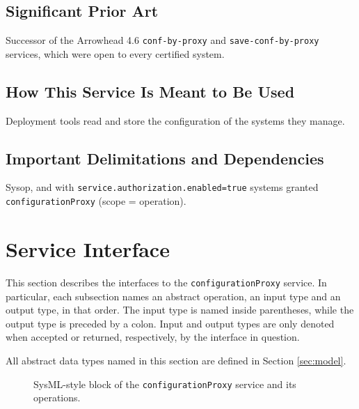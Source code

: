 \documentclass[a4paper]{arrowhead}
\begin{document}
\subsection{Significant Prior Art}

Successor of the Arrowhead 4.6 \texttt{conf-\allowbreak{}by-\allowbreak{}proxy} and \texttt{save-\allowbreak{}conf-\allowbreak{}by-\allowbreak{}proxy} services, which were open to every certified system.

\subsection{How This Service Is Meant to Be Used}

Deployment tools read and store the configuration of the systems they manage.

\subsection{Important Delimitations and Dependencies}
\label{sec:delimitations}

Sysop, and with \texttt{service.\allowbreak{}authorization.\allowbreak{}enabled=\allowbreak{}true} systems granted \texttt{configurationProxy} (scope = operation).

\newpage

\section{Service Interface}
\label{sec:operations}

This section describes the interfaces to the \texttt{configurationProxy} service.
In particular, each subsection names an abstract operation, an input type and an output type, in that order.
The input type is named inside parentheses, while the output type is preceded by a colon.
Input and output types are only denoted when accepted or returned, respectively, by the interface in question.

All abstract data types named in this section are defined in Section \ref{sec:model}.

\begin{figure}[ht!]
  \centering
  \caption{SysML-style block of the \texttt{configurationProxy} service and its operations.}
  \label{fig:SD}
\end{figure}
\end{document}
